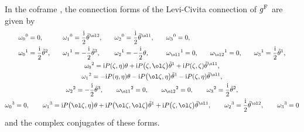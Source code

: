 \begin{Proposition}\label{connection}
In the coframe , the connection forms of the Levi-Civita connection of $g^{\rm F}$ are given by
\begin{gather*}
\begin{alignedat}{7}
&\omega_0{}^0=0,\qquad&& \omega_1{}^0=\frac{{\rm i}}{2}\tilde\theta^{\ol2},\qquad&& \omega_2{}^0=\frac{{\rm i}}{2}\tilde\theta^{\ol1},\qquad&& \omega_3{}^0=0,& \\
&\omega_0{}^1=\frac{{\rm i}}{2}\tilde\theta^2,\qquad&& \omega_1{}^1=-\frac{{\rm i}}{2}\tilde\theta^3,\qquad&& \omega_2{}^1=-\frac{{\rm i}}{2}\theta,\qquad&& \omega_{\ol1}{}^1=0,\qquad && \omega_{\ol2}{}^1=0,\qquad&& \omega_3{}^1=\frac{{\rm i}}{2}\tilde\theta^1,&
\end{alignedat}
\\
\omega_0{}^2={\rm i}P(\zeta, \eta)\theta+{\rm i}P\bigl(\zeta, \ol\zeta\bigr)\tilde\theta^1+{\rm i}P(\zeta, \zeta)\tilde\theta^{\ol1},\\
\omega_1{}^2=-{\rm i}P(\eta, \eta)\theta-{\rm i}P\bigl(\ol\zeta, \eta\bigr)\tilde\theta^1-{\rm i}P(\zeta, \eta)\tilde\theta^{\ol1}, \\
\omega_2{}^2=-\frac{{\rm i}}{2}\tilde\theta^3, \qquad
\omega_{\ol1}{}^2=0, \qquad \omega_{\ol2}{}^2=0, \qquad \omega_3{}^2=\frac{{\rm i}}{2}\tilde\theta^2, \\
\omega_0{}^3=0, \qquad \omega_1{}^3={\rm i}P\bigl(\ol\zeta, \eta\bigr)\theta+{\rm i}P\bigl(\ol\zeta, \ol\zeta\bigr)\tilde\theta^1+{\rm i}P\bigl(\zeta, \ol\zeta\bigr)\tilde\theta^{\ol1}, \qquad \omega_2{}^3=\frac{{\rm i}}{2}\tilde\theta^{\ol2}, \qquad
\omega_3{}^3=0
\end{gather*}
and the complex conjugates of these forms.
\end{Proposition}

